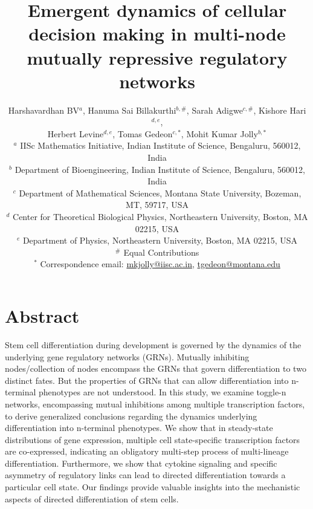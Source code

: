 \documentclass[11pt,a4paper]{article}
\title{Emergent dynamics of cellular decision making in multi-node mutually repressive regulatory networks}
\author{Harshavardhan BV$^{a}$, Hanuma Sai Billakurthi$^{b,\#}$, Sarah Adigwe$^{c,\#}$,  Kishore Hari$^{d, e}$,\\ Herbert Levine$^{d, e}$, Tomas Gedeon$^{c, *}$, Mohit Kumar Jolly$^{b,*}$ 
\\
{\scriptsize $^{a}$ IISc Mathematics Initiative, Indian Institute of Science, Bengaluru, 560012, India}\\
{\scriptsize $^{b}$ Department of Bioengineering, Indian Institute of Science, Bengaluru, 560012, India}\\
{\scriptsize $^{c}$ Department of Mathematical Sciences, Montana State University, Bozeman, MT, 59717, USA}\\
{\scriptsize $^{d}$ Center for Theoretical Biological Physics, Northeastern University, Boston, MA 02215, USA}\\
{\scriptsize $^{e}$ Department of Physics, Northeastern University, Boston, MA 02215, USA}\\
{\scriptsize $^{\#}$ Equal Contributions}\\
\scriptsize{$^{*}$ Correspondence email: \href{mailto:mkjolly@iisc.ac.in}{mkjolly@iisc.ac.in}}, \href{mailto:tgedeon@montana.edu}{tgedeon@montana.edu}}
\date{}
\theoremstyle{definition}
\theoremstyle{remark}
\begin{document}
\maketitle

\section*{Abstract}
Stem cell differentiation during development is governed by the dynamics of the underlying gene regulatory networks (GRNs). Mutually inhibiting nodes/collection of nodes encompass the GRNs that govern differentiation to two distinct fates. But the properties of GRNs that can allow differentiation into n-terminal phenotypes are not understood. In this study, we examine toggle-n networks, encompassing mutual inhibitions among multiple transcription factors, to derive generalized conclusions regarding the dynamics underlying differentiation into n-terminal phenotypes. We show that in steady-state distributions of gene expression, multiple cell state-specific transcription factors are co-expressed, indicating an obligatory multi-step process of multi-lineage differentiation. Furthermore, we show that cytokine signaling and specific asymmetry of regulatory links can lead to directed differentiation towards a particular cell state. Our findings provide valuable insights into the mechanistic aspects of directed differentiation of stem cells.

\newpage
\end{document}
